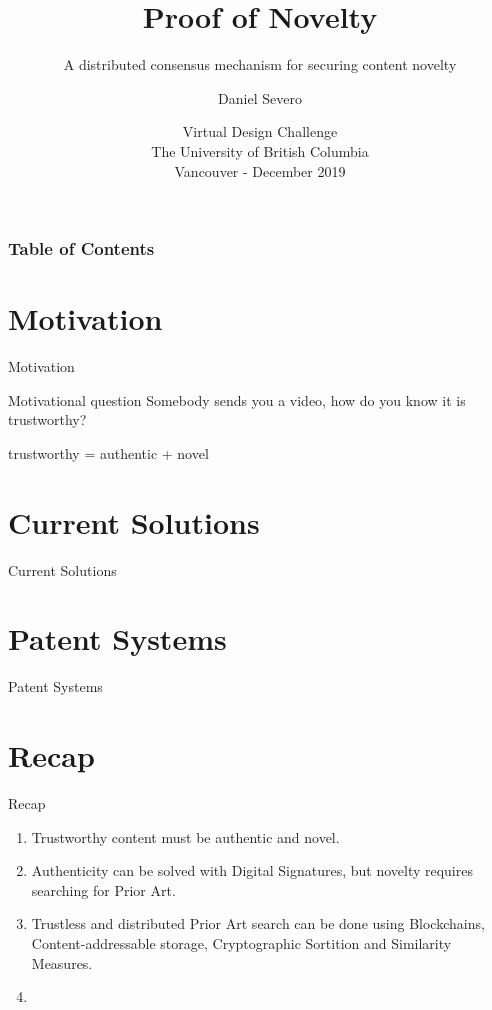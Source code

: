 \documentclass{beamer}
\title[Proof of Novelty] %
{Proof of Novelty}
\subtitle{A distributed consensus mechanism for securing content novelty}
\author[Severo, Daniel] %
{Daniel Severo}
\institute %
{Independent Scientist}
\date[VDC 2019] %
{Virtual Design Challenge \\ The University of British Columbia \\ Vancouver - December 2019}
\begin{document}
\frame{\titlepage}


\begin{frame}
\frametitle{Table of Contents}
\tableofcontents
\end{frame}


\section{Motivation}
\begin{frame}{Motivation}
    \begin{block}{Motivational question}
        Somebody sends you a video, how do you know it is trustworthy?
    \end{block}
    trustworthy = authentic + novel
\end{frame}

\section{Current Solutions}
\begin{frame}{Current Solutions}
\end{frame}

\section{Patent Systems}
\begin{frame}{Patent Systems}
\end{frame}

\section{Recap}
\begin{frame}{Recap}
\begin{enumerate}
    \item<1-> Trustworthy content must be authentic and novel.

    \item<2-> Authenticity can be solved with Digital Signatures, but novelty requires searching for Prior Art.
    
    \item<3-> Trustless and distributed Prior Art search can be done using Blockchains, Content-addressable storage, Cryptographic Sortition and Similarity Measures.

    \item<4-> 
\end{enumerate}
\end{frame}
\end{document}
